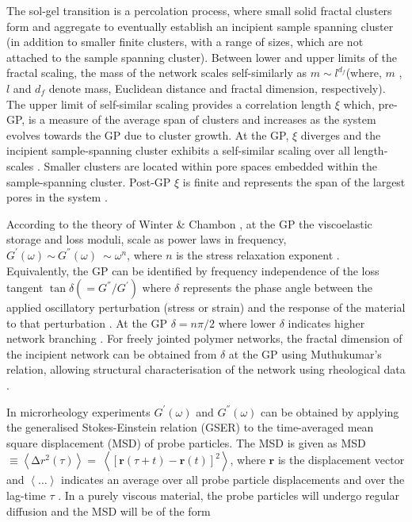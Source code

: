\documentclass[%
 aip,
 amsmath,amssymb,
reprint, onecolumn %
]{revtex4-1}
\begin{document}
The sol-gel transition is a percolation process, where small solid fractal clusters form and aggregate to eventually establish an incipient sample spanning cluster (in addition to smaller finite clusters, with a range of sizes, which are not attached to the sample spanning cluster). Between lower and upper limits of the fractal scaling, the mass of the network scales self-similarly as $m\sim l^{d_{f}}$(where, $m$ , $l$ and $d_{f}$ denote mass, Euclidean distance and fractal dimension, respectively). The upper limit of self-similar scaling provides a correlation length $\xi$ which, pre-GP, is a measure of the average span of clusters and increases as the system evolves towards the GP due to cluster growth. At the GP, $\xi$ diverges and the incipient sample-spanning cluster exhibits a self-similar scaling over all length-scales \cite{Curtis2013}. Smaller clusters are located within pore spaces embedded within the sample-spanning cluster. Post-GP $\xi$ is finite and represents the span of the largest pores in the system \cite{Ben-Avraham2000}.

According to the theory of Winter \& Chambon \cite{Chambon1987}, at the GP the viscoelastic storage and loss moduli, scale as power laws in frequency,  $G^{'}(\omega)\ {\sim\ G}^{''}(\omega)\ \sim\omega^{n}$, where $n$ is the stress relaxation exponent \cite{Larsen2008}.
Equivalently, the GP can be identified by frequency independence of the loss tangent $\tan\delta\left( = G^{''}/G^{'} \right)$ where $\delta$
represents the phase angle between the applied oscillatory perturbation (stress or strain) and the response of the material to that perturbation \cite{Chambon1987}. At the GP $\delta = n\pi/2$ where lower $\delta$ indicates higher network branching \cite{Muthukumar1989}. For freely jointed polymer networks, the fractal dimension of the incipient network can be obtained from $\delta$ at the GP using Muthukumar's relation, allowing structural characterisation of the network using rheological data \cite{Muthukumar1989,Muthukumar1985}.

In microrheology experiments $G^{'}(\omega)$ and $G^{''}(\omega)$ can be obtained by applying the generalised Stokes-Einstein relation (GSER) to the time-averaged mean square displacement (MSD) of probe particles\cite{Mason1995,Mason2000}. The MSD is given as MSD $\equiv \left\langle \mathrm{\Delta}r^{2}(\tau) \right\rangle = \ \left\langle \left\lbrack \mathbf{r}(\tau + t) - \mathbf{r}(t) \right\rbrack^{2} \right\rangle$, where $\mathbf{r}$ is the displacement vector and $\left\langle \ldots \right\rangle$ indicates an average over all probe particle displacements and over the lag-time $\tau$ \cite{Moschakis2013}. In a purely viscous material, the probe particles will undergo regular diffusion and the MSD will be of the form
\end{document}

